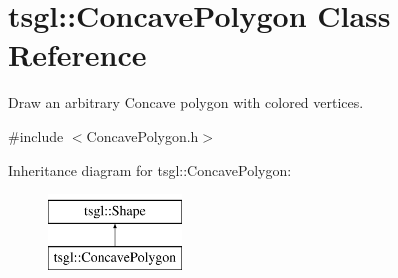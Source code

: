 \hypertarget{classtsgl_1_1_concave_polygon}{\section{tsgl\-:\-:\-Concave\-Polygon \-Class \-Reference}
\label{classtsgl_1_1_concave_polygon}
}


\-Draw an arbitrary \-Concave polygon with colored vertices.  




{\ttfamily \#include $<$\-Concave\-Polygon.\-h$>$}

\-Inheritance diagram for tsgl\-:\-:\-Concave\-Polygon\-:\begin{figure}[H]
\begin{center}
\leavevmode
\includegraphics[height=2.000000cm]{classtsgl_1_1_concave_polygon}
\end{center}
\end{figure}
